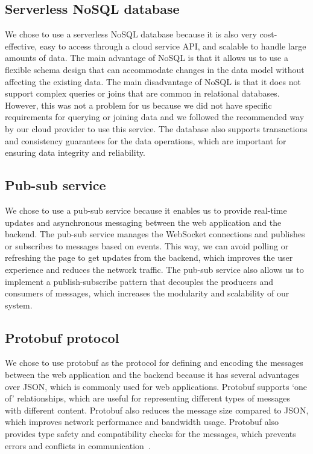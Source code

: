 \documentclass[
	english,
	ruledheaders=section,   %
	class=report,		    %
	thesis={type=bachelor}, %
	accentcolor=9c,			%
	custommargins=true,    %
	marginpar=false,        %
	parskip=half-,          %
	fontsize=11pt,          %
]{tudapub}
\begin{document}
\subsection{Serverless NoSQL database} 
We chose to use a serverless NoSQL database because it is also very cost-effective, easy to access through a cloud service API, and scalable to handle large amounts of data. The main advantage of NoSQL is that it allows us to use a flexible schema design that can accommodate changes in the data model without affecting the existing data. The main disadvantage of NoSQL is that it does not support complex queries or joins that are common in relational databases. However, this was not a problem for us because we did not have specific requirements for querying or joining data and we followed the recommended way by our cloud provider to use this service. The database also supports transactions and consistency guarantees for the data operations, which are important for ensuring data integrity and reliability.

\subsection{Pub-sub service}
We chose to use a pub-sub service because it enables us to provide real-time updates and asynchronous messaging between the web application and the backend. The pub-sub service manages the WebSocket connections and publishes or subscribes to messages based on events. This way, we can avoid polling or refreshing the page to get updates from the backend, which improves the user experience and reduces the network traffic. The pub-sub service also allows us to implement a publish-subscribe pattern that decouples the producers and consumers of messages, which increases the modularity and scalability of our system.

\subsection{Protobuf protocol}
We chose to use protobuf as the protocol for defining and encoding the messages between the web application and the backend because it has several advantages over JSON, which is commonly used for web applications. Protobuf supports ‘one of’ relationships, which are useful for representing different types of messages with different content. Protobuf also reduces the message size compared to JSON, which improves network performance and bandwidth usage. Protobuf also provides type safety and compatibility checks for the messages, which prevents errors and conflicts in communication~\cite{protobuf}.
\end{document}
